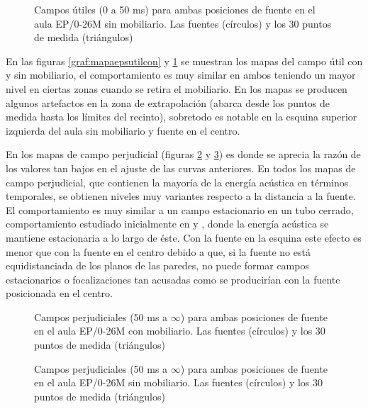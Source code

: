 \begin{figure}[H]
    \centering%
        {%
    }
    \caption{Campos útiles (0 a 50 ms) para ambas posiciones de fuente en el aula EP/0-26M sin mobiliario. Las fuentes (círculos) y los 30 puntos de medida (triángulos)}
    \label{graf:mapaepsutilsin}%
\end{figure}

En las figuras \ref{graf:mapaepsutilcon} y \ref{graf:mapaepsutilsin} se muestran los mapas del campo útil con y sin mobiliario, el comportamiento es muy similar en ambos teniendo un mayor nivel en ciertas zonas cuando se retira el mobiliario. En los mapas se producen algunos artefactos en la zona de extrapolación (abarca desde los puntos de medida hasta los límites del recinto), sobretodo es notable en la esquina superior izquierda del aula sin mobiliario y fuente en el centro.
\\
\par 
En los mapas de campo perjudicial (figuras \ref{graf:mapaepsperjudicialcon} y \ref{graf:mapaepsperjudicialsin}) es donde se aprecia la razón de los valores tan bajos en el ajuste de las curvas anteriores. En todos los mapas de campo perjudicial, que contienen la mayoría de la energía acústica en términos temporales, se obtienen niveles muy variantes respecto a la distancia a la fuente. El comportamiento es muy similar a un campo estacionario en un tubo cerrado, comportamiento estudiado inicialmente en \cite{Kundt1866} y \cite{Kundt1868}, donde la energía acústica se mantiene estacionaria a lo largo de éste. Con la fuente en la esquina este efecto es menor que con la fuente en el centro debido a que, si la fuente no está equidistanciada de los planos de las paredes, no puede formar campos estacionarios o focalizaciones tan acusadas como se producirían con la fuente posicionada en el centro.

\begin{figure}[H]
    \centering%
        {%
    }
    \caption{Campos perjudiciales (50 ms a $\infty$) para ambas posiciones de fuente en el aula EP/0-26M con mobiliario. Las fuentes (círculos) y los 30 puntos de medida (triángulos)}
    \label{graf:mapaepsperjudicialcon}%
    \vspace{-0.4cm}%
\end{figure}


\begin{figure}[H]
    \centering%
        {%
    }
    \caption{Campos perjudiciales (50 ms a $\infty$) para ambas posiciones de fuente en el aula EP/0-26M sin mobiliario. Las fuentes (círculos) y los 30 puntos de medida (triángulos)}
    \label{graf:mapaepsperjudicialsin}%
\end{figure}

